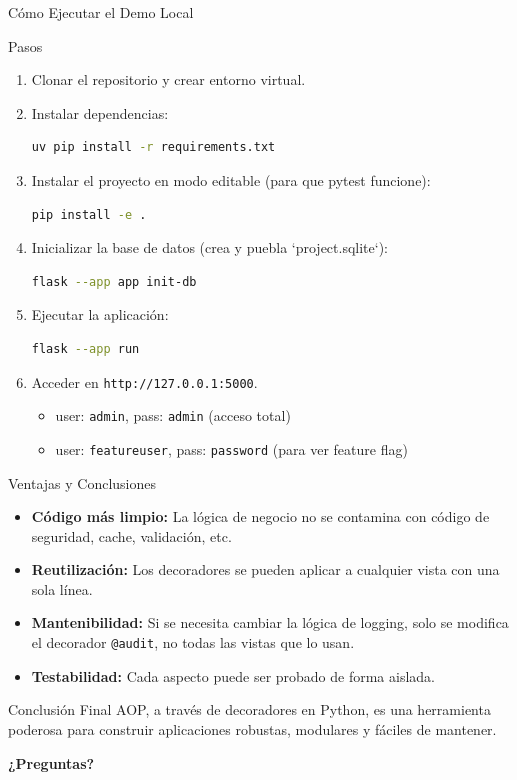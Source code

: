 \documentclass[spanish]{beamer}
\begin{document}
\begin{frame}[fragile]{Cómo Ejecutar el Demo Local}
    \begin{block}{Pasos}
    \begin{enumerate}
        \item Clonar el repositorio y crear entorno virtual.
        \item Instalar dependencias:
        \begin{lstlisting}[language=bash]
uv pip install -r requirements.txt
        \end{lstlisting}
        \item Instalar el proyecto en modo editable (para que pytest funcione):
        \begin{lstlisting}[language=bash]
pip install -e .
        \end{lstlisting}
        \item Inicializar la base de datos (crea y puebla `project.sqlite`):
        \begin{lstlisting}[language=bash]
flask --app app init-db
        \end{lstlisting}
        \item Ejecutar la aplicación:
        \begin{lstlisting}[language=bash]
flask --app run
        \end{lstlisting}
        \item Acceder en \texttt{http://127.0.0.1:5000}.
            \begin{itemize}
                \item user: \texttt{admin}, pass: \texttt{admin} (acceso total)
                \item user: \texttt{featureuser}, pass: \texttt{password} (para ver feature flag)
            \end{itemize}
    \end{enumerate}
    \end{block}
\end{frame}

\begin{frame}{Ventajas y Conclusiones}
    \begin{itemize}
        \item<1-> \textbf{Código más limpio:} La lógica de negocio no se contamina con código de seguridad, cache, validación, etc.
        \item<2-> \textbf{Reutilización:} Los decoradores se pueden aplicar a cualquier vista con una sola línea.
        \item<3-> \textbf{Mantenibilidad:} Si se necesita cambiar la lógica de logging, solo se modifica el decorador \texttt{@audit}, no todas las vistas que lo usan.
        \item<4-> \textbf{Testabilidad:} Cada aspecto puede ser probado de forma aislada.
    \end{itemize}
    \vfill
    \begin{alertblock}{Conclusión Final}
        AOP, a través de decoradores en Python, es una herramienta poderosa para construir aplicaciones robustas, modulares y fáciles de mantener.
    \end{alertblock}
\end{frame}

\begin{frame}
    \begin{center}
        \Huge\bfseries ¿Preguntas?
    \end{center}
\end{frame}
\end{document}
